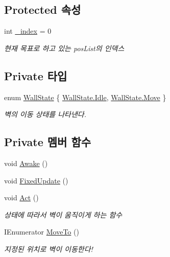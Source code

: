 \subsection*{Protected 속성}
\begin{DoxyCompactItemize}
\item 
int \mbox{\hyperlink{class_moving_platform_a20948e50a50c338c4e62f84a633868ac}{\+\_\+index}} = 0
\begin{DoxyCompactList}\small\item\em 현재 목표로 하고 있는 pos\+List의 인덱스 \end{DoxyCompactList}\end{DoxyCompactItemize}
\subsection*{Private 타입}
\begin{DoxyCompactItemize}
\item 
enum \mbox{\hyperlink{class_moving_platform_ac47e764b71989317aab0bad26d82a901}{Wall\+State}} \{ \mbox{\hyperlink{class_moving_platform_ac47e764b71989317aab0bad26d82a901ae599161956d626eda4cb0a5ffb85271c}{Wall\+State.\+Idle}}, 
\mbox{\hyperlink{class_moving_platform_ac47e764b71989317aab0bad26d82a901a6bc362dbf494c61ea117fe3c71ca48a5}{Wall\+State.\+Move}}
 \}
\begin{DoxyCompactList}\small\item\em 벽의 이동 상태를 나타낸다. \end{DoxyCompactList}\end{DoxyCompactItemize}
\subsection*{Private 멤버 함수}
\begin{DoxyCompactItemize}
\item 
void \mbox{\hyperlink{class_moving_platform_aec6412bf79a5d4fdec57da2e3b390b93}{Awake}} ()
\item 
void \mbox{\hyperlink{class_moving_platform_a935710333a3a0f0164dad887e8eb7d1c}{Fixed\+Update}} ()
\item 
void \mbox{\hyperlink{class_moving_platform_ab4a3f15333f41ba4a3b9bc0227777460}{Act}} ()
\begin{DoxyCompactList}\small\item\em 상태에 따라서 벽이 움직이게 하는 함수 \end{DoxyCompactList}\item 
I\+Enumerator \mbox{\hyperlink{class_moving_platform_afb52616391e79cf7e015f5fb37d50e16}{Move\+To}} ()
\begin{DoxyCompactList}\small\item\em 지정된 위치로 벽이 이동한다! \end{DoxyCompactList}\end{DoxyCompactItemize}
